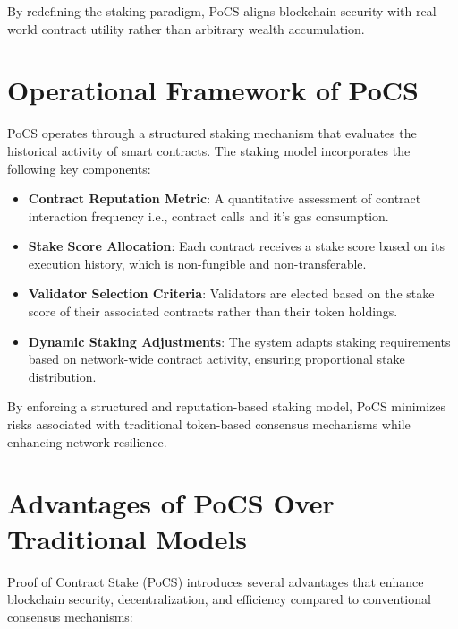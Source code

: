 \documentclass{article}
\begin{document}
By redefining the staking paradigm, PoCS aligns blockchain security with real-world contract utility rather than arbitrary wealth accumulation.

\section{Operational Framework of PoCS}

PoCS operates through a structured staking mechanism that evaluates the historical activity of smart contracts. The staking model incorporates the following key components:

\begin{itemize}
    \item \textbf{Contract Reputation Metric}: A quantitative assessment of contract interaction frequency i.e., contract calls and it's gas consumption.
    \item \textbf{Stake Score Allocation}: Each contract receives a stake score based on its execution history, which is non-fungible and non-transferable.
    \item \textbf{Validator Selection Criteria}: Validators are elected based on the stake score of their associated contracts rather than their token holdings.
    \item \textbf{Dynamic Staking Adjustments}: The system adapts staking requirements based on network-wide contract activity, ensuring proportional stake distribution.
\end{itemize}

By enforcing a structured and reputation-based staking model, PoCS minimizes risks associated with traditional token-based consensus mechanisms while enhancing network resilience.

\section{Advantages of PoCS Over Traditional Models}

Proof of Contract Stake (PoCS) introduces several advantages that enhance blockchain security, decentralization, and efficiency compared to conventional consensus mechanisms:
\end{document}

